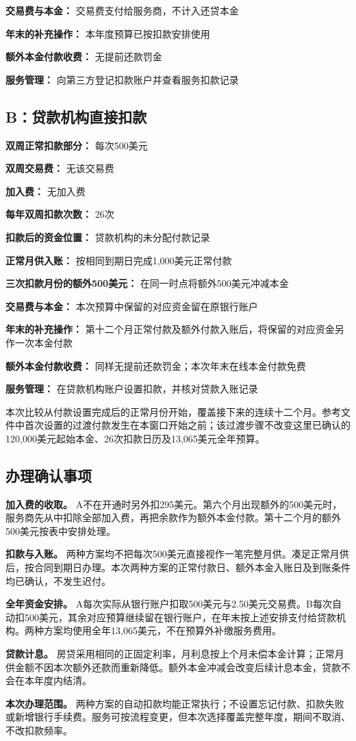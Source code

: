 \documentclass[UTF8,fontset=none,11pt,a4paper]{ctexart}
\begin{document}
\textbf{交易费与本金：} 交易费支付给服务商，不计入还贷本金


\textbf{年末的补充操作：} 本年度预算已按扣款安排使用


\textbf{额外本金付款收费：} 无提前还款罚金


\textbf{服务管理：} 向第三方登记扣款账户并查看服务扣款记录


\subsection*{B：贷款机构直接扣款}
\textbf{双周正常扣款部分：} 每次500美元


\textbf{双周交易费：} 无该交易费


\textbf{加入费：} 无加入费


\textbf{每年双周扣款次数：} 26次


\textbf{扣款后的资金位置：} 贷款机构的未分配付款记录


\textbf{正常月供入账：} 按相同到期日完成1,000美元正常付款


\textbf{三次扣款月份的额外500美元：} 在同一时点将额外500美元冲减本金


\textbf{交易费与本金：} 本次预算中保留的对应资金留在原银行账户


\textbf{年末的补充操作：} 第十二个月正常付款及额外付款入账后，将保留的对应资金另作一次本金付款


\textbf{额外本金付款收费：} 同样无提前还款罚金；本次年末在线本金付款免费


\textbf{服务管理：} 在贷款机构账户设置扣款，并核对贷款入账记录


本次比较从付款设置完成后的正常月份开始，覆盖接下来的连续十二个月。参考文件中首次设置的过渡付款发生在本窗口开始之前；该过渡步骤不改变这里已确认的120,000美元起始本金、26次扣款日历及13,065美元全年预算。


\subsection*{办理确认事项}
\textbf{加入费的收取。} A不在开通时另外扣295美元。第六个月出现额外的500美元时，服务商先从中扣除全部加入费，再把余款作为额外本金付款。第十二个月的额外500美元按表中安排处理。


\textbf{扣款与入账。} 两种方案均不把每次500美元直接视作一笔完整月供。凑足正常月供后，按合同到期日办理。本次两种方案的正常付款日、额外本金入账日及到账条件均已确认，不发生迟付。


\textbf{全年资金安排。} A每次实际从银行账户扣取500美元与2.50美元交易费。B每次自动扣500美元，其余对应预算继续留在银行账户，在年末按上述安排支付给贷款机构。两种方案均使用全年13,065美元，不在预算外补缴服务费用。


\textbf{贷款计息。} 房贷采用相同的正固定利率，月利息按上个月未偿本金计算；正常月供金额不因本次额外还款而重新降低。额外本金冲减会改变后续计息本金，贷款不会在本年度内结清。


\textbf{本次办理范围。} 两种方案的自动扣款均能正常执行；不设置忘记付款、扣款失败或新增银行手续费。服务可按流程变更，但本次选择覆盖完整年度，期间不取消、不改扣款频率。
\end{document}
